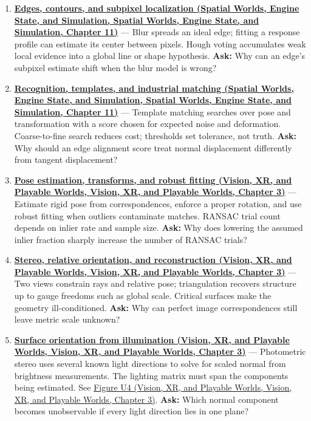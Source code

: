 \begin{enumerate}
\item
  \textbf{\href{../05-Spatial-Worlds-Engine-State-and-Simulation/main.pdf\#nameddest=04-visual-computing-ii-ch030-edges-contours-and-subpixel-localization}{Edges, contours, and subpixel localization (Spatial Worlds, Engine State, and Simulation, Spatial Worlds, Engine State, and Simulation, Chapter 11)}} --- Blur spreads an ideal edge; fitting a response profile can estimate its center between pixels. Hough voting accumulates weak local evidence into a global line or shape hypothesis. \textbf{Ask:} Why can an edge's subpixel estimate shift when the blur model is wrong?
\item
  \textbf{\href{../05-Spatial-Worlds-Engine-State-and-Simulation/main.pdf\#nameddest=04-visual-computing-ii-ch030-recognition-templates-and-industrial-matching}{Recognition, templates, and industrial matching (Spatial Worlds, Engine State, and Simulation, Spatial Worlds, Engine State, and Simulation, Chapter 11)}} --- Template matching searches over pose and transformation with a score chosen for expected noise and deformation. Coarse-to-fine search reduces cost; thresholds set tolerance, not truth. \textbf{Ask:} Why should an edge alignment score treat normal displacement differently from tangent displacement?
\item
  \textbf{\href{../07-Vision-XR-and-Playable-Worlds/main.pdf\#nameddest=04-visual-computing-ii-ch032-pose-estimation-transforms-and-robust-fitting}{Pose estimation, transforms, and robust fitting (Vision, XR, and Playable Worlds, Vision, XR, and Playable Worlds, Chapter 3)}} --- Estimate rigid pose from correspondences, enforce a proper rotation, and use robust fitting when outliers contaminate matches. RANSAC trial count depends on inlier rate and sample size. \textbf{Ask:} Why does lowering the assumed inlier fraction sharply increase the number of RANSAC trials?
\item
  \textbf{\href{../07-Vision-XR-and-Playable-Worlds/main.pdf\#nameddest=04-visual-computing-ii-ch032-stereo-relative-orientation-and-reconstruction}{Stereo, relative orientation, and reconstruction (Vision, XR, and Playable Worlds, Vision, XR, and Playable Worlds, Chapter 3)}} --- Two views constrain rays and relative pose; triangulation recovers structure up to gauge freedoms such as global scale. Critical surfaces make the geometry ill-conditioned. \textbf{Ask:} Why can perfect image correspondences still leave metric scale unknown?
\item
  \textbf{\href{../07-Vision-XR-and-Playable-Worlds/main.pdf\#nameddest=04-visual-computing-ii-ch032-surface-orientation-from-illumination}{Surface orientation from illumination (Vision, XR, and Playable Worlds, Vision, XR, and Playable Worlds, Chapter 3)}} --- Photometric stereo uses several known light directions to solve for scaled normal from brightness measurements. The lighting matrix must span the components being estimated. See \href{../07-Vision-XR-and-Playable-Worlds/main.pdf\#nameddest=04-visual-computing-ii-ch032-figure-u4---lighting-rank-determines-which-normal-components-can-be-measured}{Figure U4 (Vision, XR, and Playable Worlds, Vision, XR, and Playable Worlds, Chapter 3)}. \textbf{Ask:} Which normal component becomes unobservable if every light direction lies in one plane?

\end{enumerate}
